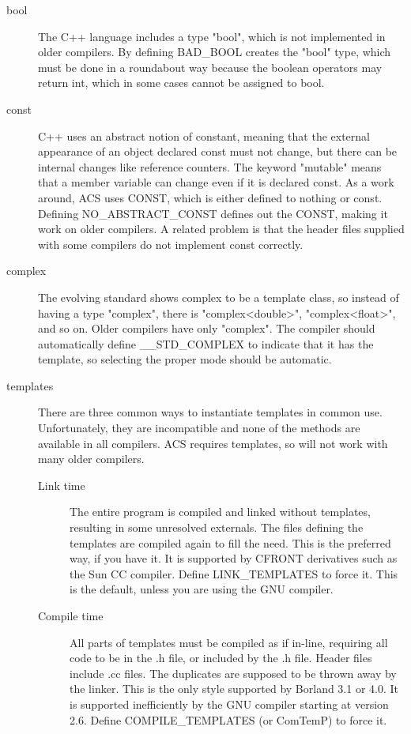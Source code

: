 \begin{description}

\item[bool] The C++ language includes a type "bool", which is not
implemented in older compilers.  By defining BAD\_BOOL creates the
"bool" type, which must be done in a roundabout way because the
boolean operators may return int, which in some cases cannot be
assigned to bool.

\item[const] C++ uses an abstract notion of constant, meaning that
the external appearance of an object declared const must not change,
but there can be internal changes like reference counters.  The
keyword "mutable" means that a member variable can change even if
it is declared const.  As a work around, ACS uses CONST, which is
either defined to nothing or const.  Defining NO\_ABSTRACT\_CONST
defines out the CONST, making it work on older compilers.  A related
problem is that the header files supplied with some compilers do
not implement const correctly.

\item[complex] The evolving standard shows complex to be a template
class, so instead of having a type "complex", there is "complex<double>",
"complex<float>", and so on.  Older compilers have only "complex".
The compiler should automatically define \_\_STD\_COMPLEX to indicate
that it has the template, so selecting the proper mode should be
automatic.

\item[templates] There are three common ways to instantiate templates
in common use.  Unfortunately, they are incompatible and none of
the methods are available in all compilers.  ACS requires templates,
so will not work with many older compilers.

\begin{description}

\item[Link time] The entire program is compiled and linked without
templates, resulting in some unresolved externals.  The files
defining the templates are compiled again to fill the need.  This
is the preferred way, if you have it.  It is supported by CFRONT
derivatives such as the Sun CC compiler.  Define LINK\_TEMPLATES to
force it.  This is the default, unless you are using the GNU
compiler.

\item[Compile time] All parts of templates must be compiled as if
in-line, requiring all code to be in the .h file, or included by
the .h file.  Header files include .cc files.  The duplicates are
supposed to be thrown away by the linker.  This is the only style
supported by Borland 3.1 or 4.0.  It is supported inefficiently by
the GNU compiler starting at version 2.6.  Define COMPILE\_TEMPLATES
(or ComTemP) to force it.


\end{description}
\end{description}
